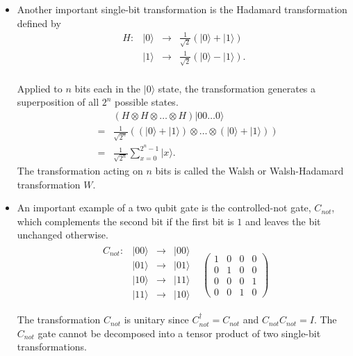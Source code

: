 \documentclass{article}
\def\pagedone{\newpage}
\def\ket#1{|{#1}\rangle}
\begin{document}
\pagedone

\begin{itemize}

\item Another important single-bit transformation is the 
Hadamard transformation defined by
$$\begin{array}{lrcl}
H:& \ket{0} & \to & \frac{1}{\sqrt 2}(\ket 0 + \ket 1)\\
  & \ket{1} & \to & \frac{1}{\sqrt 2}(\ket 0 - \ket 1).\\
\end{array}$$
 
Applied to $n$ bits each in the $\ket 0$ state, the transformation generates a superposition of all $2^n$ 
possible states. 
\begin{eqnarray*}
& &(H\otimes H \otimes \dots \otimes H)\ket{00\dots 0}\\
&=&\frac{1}{\sqrt {2^n}}\left((\ket 0+\ket 1)\otimes\dots\otimes(\ket 0+\ket 1
)\right)\\ 
&=&\frac{1}{\sqrt {2^n}}\sum_{x=0}^{2^n-1}\ket x.
\end{eqnarray*}
The transformation acting on $n$ bits is called the 
Walsh or Walsh-Hadamard  
transformation $W$.

\pagedone

\item An important example of a two qubit gate is the controlled-{\sc not} gate, $C_{not}$, which complements the second 
bit if the first bit is $1$ and leaves the bit unchanged otherwise.
$$\begin{array}{ll}\begin{array}{lrcl}
C_{not}:& \ket{00} & \to & \ket{00}\\
        & \ket{01} & \to & \ket{01}\\
        & \ket{10} & \to & \ket{11}\\
        & \ket{11} & \to & \ket{10}\\
\end{array} & \left(\begin{array}{cccc}1 & 0 & 0 & 0\\ 0 & 1 & 0 & 0\\
				       0 & 0 & 0 & 1\\ 0 & 0 & 1 & 0\end{array}\right)\\
\end{array}$$
The transformation $C_{not}$ is unitary since $C_{not}^\dag=C_{not}$ and
$C_{not}C_{not}= I$. 
The $C_{not}$ gate cannot
be decomposed into a tensor product of two 
single-bit transformations.


\end{itemize}
\end{document}
